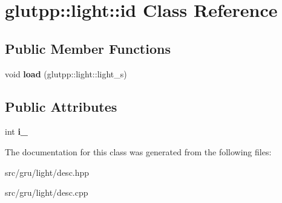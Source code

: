 \hypertarget{classglutpp_1_1light_1_1id}{\section{glutpp\-:\-:light\-:\-:id \-Class \-Reference}
\label{classglutpp_1_1light_1_1id}
}
\subsection*{\-Public \-Member \-Functions}
\begin{DoxyCompactItemize}
\item 
\hypertarget{classglutpp_1_1light_1_1id_a598cd078d6c892b418cbebbe0fc852a8}{void {\bfseries load} (glutpp\-::light\-::light\-\_\-s)}\label{classglutpp_1_1light_1_1id_a598cd078d6c892b418cbebbe0fc852a8}

\end{DoxyCompactItemize}
\subsection*{\-Public \-Attributes}
\begin{DoxyCompactItemize}
\item 
\hypertarget{classglutpp_1_1light_1_1id_aeab86ddd79f6a838e5c5c88d00e25727}{int {\bfseries i\-\_\-}}\label{classglutpp_1_1light_1_1id_aeab86ddd79f6a838e5c5c88d00e25727}

\end{DoxyCompactItemize}


\-The documentation for this class was generated from the following files\-:\begin{DoxyCompactItemize}
\item 
src/gru/light/desc.\-hpp\item 
src/gru/light/desc.\-cpp\end{DoxyCompactItemize}
